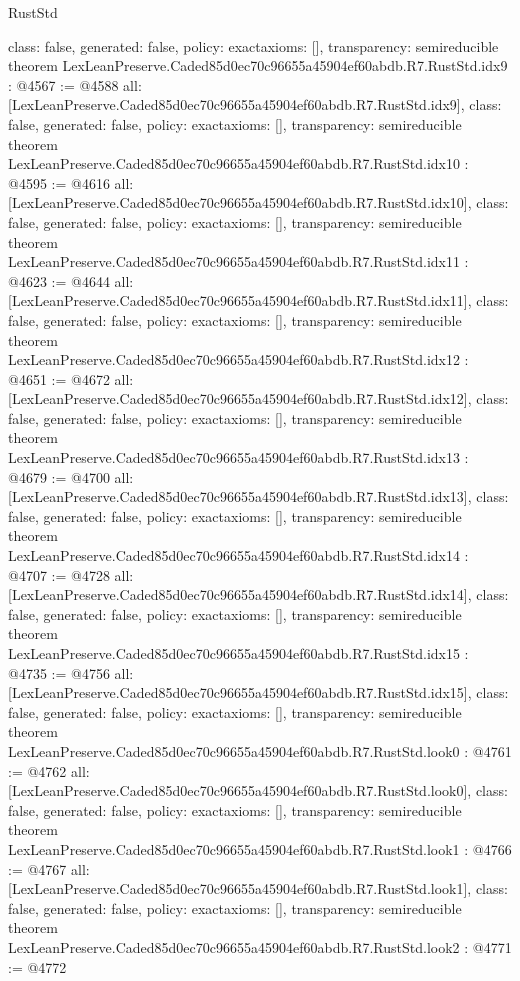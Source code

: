 \begin{lexlean}{RustStd}
\begin{coremodule}
{  class: false,
  generated: false,
  policy: exact{axioms: []},
  transparency: semireducible
}
theorem LexLeanPreserve.Caded85d0ec70c96655a45904ef60abdb.R7.RustStd.idx9 : @4567 := @4588 {
  all: [LexLeanPreserve.Caded85d0ec70c96655a45904ef60abdb.R7.RustStd.idx9],
  class: false,
  generated: false,
  policy: exact{axioms: []},
  transparency: semireducible
}
theorem LexLeanPreserve.Caded85d0ec70c96655a45904ef60abdb.R7.RustStd.idx10 : @4595 := @4616 {
  all: [LexLeanPreserve.Caded85d0ec70c96655a45904ef60abdb.R7.RustStd.idx10],
  class: false,
  generated: false,
  policy: exact{axioms: []},
  transparency: semireducible
}
theorem LexLeanPreserve.Caded85d0ec70c96655a45904ef60abdb.R7.RustStd.idx11 : @4623 := @4644 {
  all: [LexLeanPreserve.Caded85d0ec70c96655a45904ef60abdb.R7.RustStd.idx11],
  class: false,
  generated: false,
  policy: exact{axioms: []},
  transparency: semireducible
}
theorem LexLeanPreserve.Caded85d0ec70c96655a45904ef60abdb.R7.RustStd.idx12 : @4651 := @4672 {
  all: [LexLeanPreserve.Caded85d0ec70c96655a45904ef60abdb.R7.RustStd.idx12],
  class: false,
  generated: false,
  policy: exact{axioms: []},
  transparency: semireducible
}
theorem LexLeanPreserve.Caded85d0ec70c96655a45904ef60abdb.R7.RustStd.idx13 : @4679 := @4700 {
  all: [LexLeanPreserve.Caded85d0ec70c96655a45904ef60abdb.R7.RustStd.idx13],
  class: false,
  generated: false,
  policy: exact{axioms: []},
  transparency: semireducible
}
theorem LexLeanPreserve.Caded85d0ec70c96655a45904ef60abdb.R7.RustStd.idx14 : @4707 := @4728 {
  all: [LexLeanPreserve.Caded85d0ec70c96655a45904ef60abdb.R7.RustStd.idx14],
  class: false,
  generated: false,
  policy: exact{axioms: []},
  transparency: semireducible
}
theorem LexLeanPreserve.Caded85d0ec70c96655a45904ef60abdb.R7.RustStd.idx15 : @4735 := @4756 {
  all: [LexLeanPreserve.Caded85d0ec70c96655a45904ef60abdb.R7.RustStd.idx15],
  class: false,
  generated: false,
  policy: exact{axioms: []},
  transparency: semireducible
}
theorem LexLeanPreserve.Caded85d0ec70c96655a45904ef60abdb.R7.RustStd.look0 : @4761 := @4762 {
  all: [LexLeanPreserve.Caded85d0ec70c96655a45904ef60abdb.R7.RustStd.look0],
  class: false,
  generated: false,
  policy: exact{axioms: []},
  transparency: semireducible
}
theorem LexLeanPreserve.Caded85d0ec70c96655a45904ef60abdb.R7.RustStd.look1 : @4766 := @4767 {
  all: [LexLeanPreserve.Caded85d0ec70c96655a45904ef60abdb.R7.RustStd.look1],
  class: false,
  generated: false,
  policy: exact{axioms: []},
  transparency: semireducible
}
theorem LexLeanPreserve.Caded85d0ec70c96655a45904ef60abdb.R7.RustStd.look2 : @4771 := @4772 {
}
\end{coremodule}
\end{lexlean}
